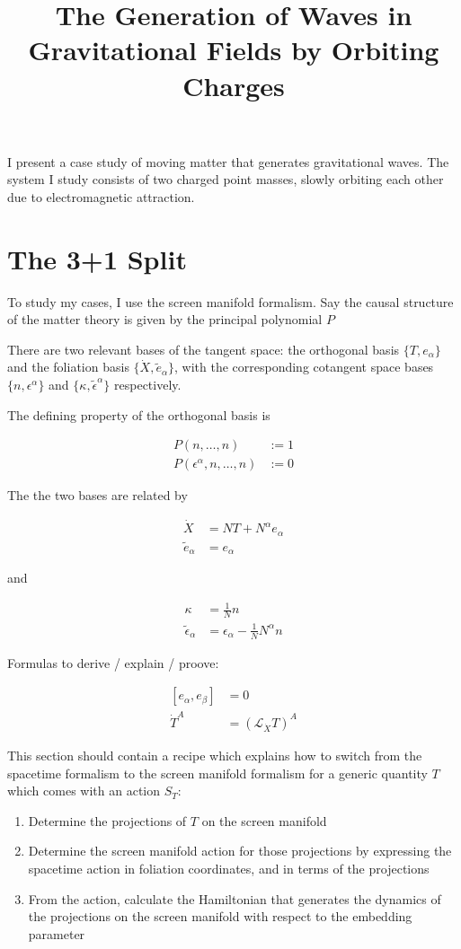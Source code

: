 \documentclass[11pt]{article}
\begin{document}
\title{The Generation of Waves in Gravitational Fields by Orbiting Charges}

I present a case study of moving matter that generates gravitational  waves. The system I study consists of two charged point masses, slowly orbiting each other due to electromagnetic attraction.

\section{The 3+1 Split}

To study my cases, I use the screen manifold formalism. Say the causal structure of the matter theory is given by the principal polynomial $P$

There are two relevant bases of the tangent space: the orthogonal basis $\{T, e_\alpha\}$ and the foliation basis $\{\dot{X} , \tilde{e}_\alpha\}$, with the corresponding cotangent space bases $\{ n, \epsilon^\alpha\}$ and $\{\kappa, \tilde{\epsilon}^\alpha \}$ respectively. 

The defining property of the orthogonal basis is

\begin{align}
	P \left( n , \dots, n \right) &:= 1 \label{frame_cond_1}\\ 
	P \left( \epsilon^\alpha , n,  \dots, n \right) &:= 0 \label{frame_cond_2}
\end{align}


The the two bases are related by

\begin{align}	
	\dot{X} &= N T + N^\alpha e_\alpha\\
	\tilde{e}_\alpha &= e_\alpha
\end{align}

and

\begin{align}	
	\kappa &= \frac{1}{N} n \\
	\tilde{\epsilon}_\alpha &= \epsilon_\alpha - \frac{1}{N} N^\alpha n
\end{align}

Formulas to derive / explain / proove:

\begin{align}
	\left[ e_{\alpha}, e_{\beta}\right] &= 0 \\
	\dot{T}^{A} &= \left( \mathcal{L}_{\dot{X}} T \right)^A
\end{align}

This section should contain a recipe which explains how to switch from the spacetime formalism to the screen manifold formalism for a generic quantity $T$ which comes with an action $S_T$:
\begin{enumerate}
	\item Determine the projections of $T$ on the screen manifold
	\item Determine the screen manifold action for those projections by expressing the spacetime action in foliation coordinates, and in terms of the projections
	\item From the action, calculate the Hamiltonian that generates the dynamics of the projections on the screen manifold with respect to the embedding parameter
\end{enumerate}
\end{document}
